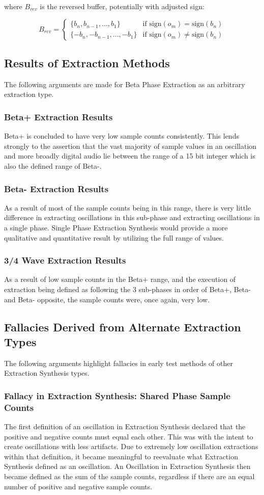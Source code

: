\documentclass[12pt,a4paper]{article}
\begin{document}
where $B_{rev}$ is the reversed buffer, potentially with adjusted sign:

\begin{equation*}
B_{rev} = \begin{cases}
    \{b_n, b_{n-1}, ..., b_1\} & \text{if } \text{sign}(o_m) = \text{sign}(b_n) \\
    \{-b_n, -b_{n-1}, ..., -b_1\} & \text{if } \text{sign}(o_m) \neq \text{sign}(b_n)
\end{cases}
\end{equation*}
\subsection{Results of Extraction Methods}
The following arguments are made for Beta Phase Extraction as an arbitrary extraction type.
\subsubsection{Beta+ Extraction Results}
Beta+ is concluded to have very low sample counts consistently. This lends strongly to the assertion that the vast majority of sample values in an oscillation and more broadly digital audio lie between the range of a 15 bit integer which is also the defined range of Beta-.
\subsubsection{Beta- Extraction Results}
As a result of most of the sample counts being in this range, there is very little difference in extracting oscillations in this sub-phase and extracting oscillations in a single phase. Single Phase Extraction Synthesis would provide a more qualitative and quantitative result by utilizing the full range of values.
\subsubsection{3/4 Wave Extraction Results}
As a result of low sample counts in the Beta+ range, and the execution of extraction being defined as following the 3 sub-phases in order of Beta+, Beta- and Beta- opposite, the sample counts were, once again, very low.
\subsection{Fallacies Derived from Alternate Extraction Types}
The following arguments highlight fallacies in early test methods of other Extraction Synthesis types.
\subsubsection{Fallacy in Extraction Synthesis: Shared Phase Sample Counts}
The first definition of an oscillation in Extraction Synthesis declared that the positive and negative counts must equal each other. This was with the intent to create oscillations with less artifacts. Due to extremely low oscillation extractions within that definition, it became meaningful to reevaluate what Extraction Synthesis defined as an oscillation. An Oscillation in Extraction Synthesis then became defined as the sum of the sample counts, regardless if there are an equal number of positive and negative sample counts.
\end{document}
